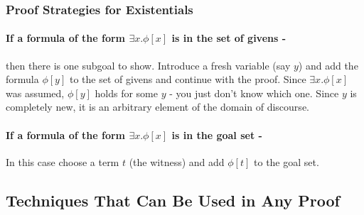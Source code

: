 \documentclass[11pt]{article}
\newcommand{\rbreak}{\ \\}
\newcommand{\NamedConditionalSequentRule}[4]{{\mbox{{\begin{tabular}{c} {\mbox{$#1$}}\vspace{.25em}\\ \hline \vspace{.25em} {\mbox{$#2$}} \end{tabular}}{\hspace{.5em}{#3}{\hspace{.25in}{#4}}}}}}
\begin{document}
\subsubsection{Proof Strategies for Existentials}


\paragraph{If a formula of the form $\exists{}x.\phi[x]$ is in the set of
  givens - } then there is one subgoal to show. Introduce a fresh variable (say
$y$) and add the formula $\phi[y]$ to the set of givens and continue with the
proof.  Since $\exists{}x.\phi[x]$ was assumed, $\phi[y]$ holds for some $y$ -
you just don't know which one. Since $y$ is completely new, it is an arbitrary
element of the domain of discourse.


\paragraph{If a formula of the form $\exists{}x.\phi[x]$ is in the goal set - }
In this case choose a term $t$ (the witness) and add $\phi[t]$ to the goal set.


\subsection{Techniques That Can Be Used in Any Proof}
\end{document}

